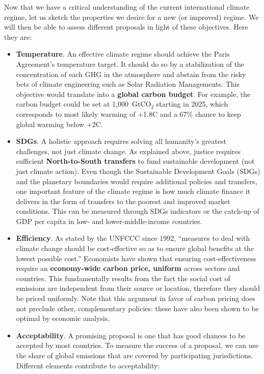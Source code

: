 \documentclass[12pt,english]{article}
\newcommand{\bo}[1]{\textbf{#1}}
\begin{document}
Now that we have a critical understanding of the current international climate regime, let us sketch the properties we desire for a new (or improved) regime. We will then be able to assess different proposals in light of these objectives. Here they are:
\begin{itemize}
  \item \bo{Temperature}. An effective climate regime should achieve the Paris Agreement's temperature target. It should do so by a stabilization of the concentration of each GHG in the atmosphere and abstain from the risky bets of climate engineering such as Solar Radiation Managements. This objective would translate into a \textbf{global carbon budget}. For example, the carbon budget could be set at 1,000~GtCO$_\text{2}$ starting in 2025, which corresponds to most likely warming of +1.8\textdegree{}C and a 67\% chance to keep global warming below +2\textdegree{}C. 
  \item \bo{SDGs}. A holistic approach requires solving all humanity's greatest challenges, not just climate change. As explained above, justice requires sufficient \textbf{North-to-South transfers} to fund sustainable development (not just climate action). Even though the Sustainable Development Goals (SDGs) and the planetary boundaries would require additional policies and transfers, one important feature of the climate regime is how much climate finance it delivers in the form of transfers to the poorest and improved market conditions. This can be measured through SDGs indicators or the catch-up of GDP per capita in low- and lower-middle-income countries.
  \item \bo{Efficiency}. As stated by the UNFCCC since 1992,\cite{unfccc_united_1992-1} ``measures to deal with climate change should be cost-effective so as to ensure global benefits at the lowest possible cost.'' Economists have shown that ensuring cost-effectiveness require an \textbf{economy-wide carbon price, uniform} across sectors and countries. This fundamentally results from the fact the social cost of emissions are independent from their source or location, therefore they should be priced uniformly. %
  Note that this argument in favor of carbon pricing does not preclude other, complementary policies: these have also been shown to be optimal by economic analysis.\cite{stiglitz_addressing_2019}
  \item \bo{Acceptability}. A promising proposal is one that has good chances to be accepted by most countries. To measure the success of a proposal, we can use the share of global emissions that are covered by participating jurisdictions. Different elements contribute to acceptability: 

\end{itemize}
\end{document}
